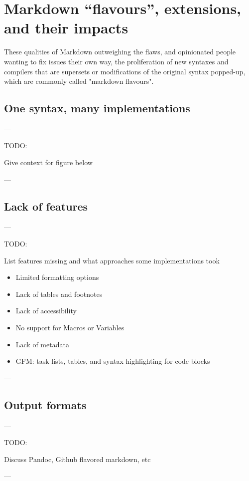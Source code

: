 \chapter{Markdown ``flavours'', extensions, and their impacts}

\vspace{1cm}


These qualities of Markdown outweighing the flaws, and opinionated people wanting to fix issues their own way, the proliferation of new syntaxes
and compilers that are supersets or modifications of the original syntax popped-up, which are commonly called "markdown flavours".

\section{One syntax, many implementations}

---

TODO:

Give context for figure below

---



\section{Lack of features}

---

TODO:

List features missing and what approaches some implementations took

\begin{itemize}
    \item Limited formatting options
    \item Lack of tables and footnotes
    \item Lack of accessibility
    \item No support for Macros or Variables
    \item Lack of metadata
    \item GFM: task lists, tables, and syntax highlighting for code blocks
\end{itemize}

---

\section{Output formats}

---

TODO:

Discuss Pandoc, Github flavored markdown, etc

---


\cite{voegler2014markdown}